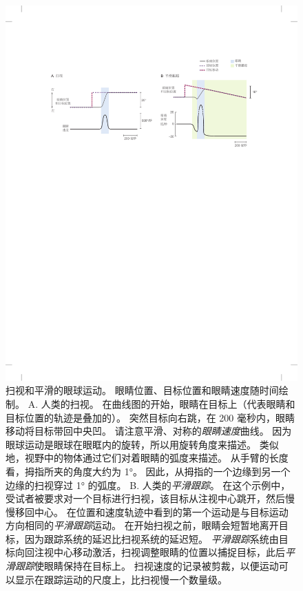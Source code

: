 \begin{figure}[htbp]
	\centering
	\includegraphics[width=1.0\linewidth]{chap35/fig_35_6}
	\caption{扫视和平滑的眼球运动。
		眼睛位置、目标位置和眼睛速度随时间绘制。
		A. 人类的扫视。
		在曲线图的开始，眼睛在目标上（代表眼睛和目标位置的轨迹是叠加的）。
		突然目标向右跳，在 200 毫秒内，眼睛移动将目标带回中央凹。
		请注意平滑、对称的\textit{眼睛速度}曲线。
		因为眼球运动是眼球在眼眶内的旋转，所以用旋转角度来描述。
		类似地，视野中的物体通过它们对着眼睛的弧度来描述。
		从手臂的长度看，拇指所夹的角度大约为 1°。
		因此，从拇指的一个边缘到另一个边缘的扫视穿过 1° 的弧度。
		B. 人类的\textit{平滑跟踪}。
		在这个示例中，受试者被要求对一个目标进行扫视，该目标从注视中心跳开，然后慢慢移回中心。
		在位置和速度轨迹中看到的第一个运动是与目标运动方向相同的\textit{平滑跟踪}运动。
		在开始扫视之前，眼睛会短暂地离开目标，因为跟踪系统的延迟比扫视系统的延迟短。
		\textit{平滑跟踪}系统由目标向回注视中心移动激活，扫视调整眼睛的位置以捕捉目标，此后\textit{平滑跟踪}使眼睛保持在目标上。
		扫视速度的记录被剪裁，以便运动可以显示在跟踪运动的尺度上，比扫视慢一个数量级。}
	\label{fig:35_6}
\end{figure}


